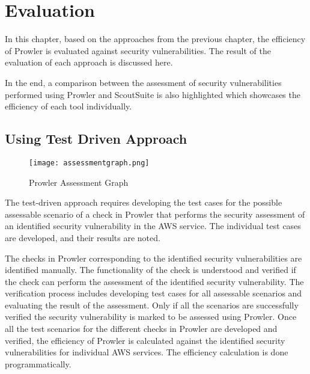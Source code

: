
\chapter{Evaluation}

\par In this chapter, based on the approaches from the
previous chapter, the efficiency of
Prowler is evaluated against security vulnerabilities.
The result of the evaluation of each approach is discussed here.

\par In the end, a comparison between the assessment of security vulnerabilities performed using Prowler and
ScoutSuite is also highlighted which showcases the efficiency of each tool individually.

\section{Using Test Driven Approach}
\begin{figure}
    \centering
    \texttt{[image: assessmentgraph.png]}
    \caption{Prowler Assessment Graph}
    \label{fig:prowlerefficiency}
\end{figure}

\par The test-driven approach requires developing the test cases for the possible assessable scenario of a check in Prowler that performs the security assessment of an identified security vulnerability in the AWS service.
The individual test cases are developed, and their results are noted.

\par The checks in Prowler corresponding to the identified security vulnerabilities are identified manually.
The functionality of the check is understood and verified if the check can perform the assessment of the identified security vulnerability.
The verification process includes developing test cases for all assessable scenarios and evaluating the result of the assessment.
Only if all the scenarios are successfully verified the security vulnerability is marked to be assessed using Prowler.
Once all the test scenarios for the different checks in Prowler are developed and verified, the efficiency of Prowler is calculated against the identified security vulnerabilities for individual AWS services.
The efficiency calculation is done programmatically.

